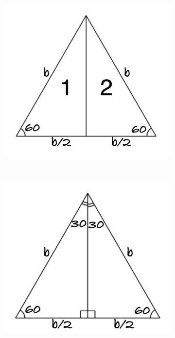 \documentclass[12pt,letter]{article}
\begin{document}
\begin{figure}[h]
\begin{subfigure}[h]{0.24\textwidth}
		\caption{}
		\label{fig:equil_tri_b}
	\end{subfigure}
	~
	\begin{subfigure}[h]{0.24\textwidth}
		\includegraphics[width=\textwidth]{equil_tri_c.pdf}
		\caption{}
		\label{fig:equil_tri_c}
	\end{subfigure} \\
	\begin{subfigure}[h]{0.24\textwidth}
		\includegraphics[width=\textwidth]{equil_tri_d.pdf}

\end{subfigure}
\end{figure}
\end{document}
